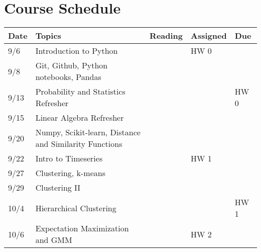 \documentclass[11pt]{article}
\begin{document}
\newpage
\section*{Course Schedule}

\small
\begin{centering}
\begin{tabular}{||l|p{3in}|l|l|l||}
\hline\hline
Date & Topics  & Reading & Assigned & Due  \\
\hline\hline
9/6 & Introduction to Python &  &  HW 0 & \\
9/8 & Git, Github, Python notebooks, Pandas & & & \\

\hline
9/13 & Probability and Statistics Refresher & &  & HW 0 \\
9/15 & Linear Algebra Refresher & & & \\
\hline

 9/20 & Numpy, Scikit-learn, Distance and Similarity Functions & &  & \\
9/22 & Intro to Timeseries & & HW 1 & \\ 
\hline

9/27 & Clustering, k-means & & & \\
9/29 & Clustering II & & & \\ 
\hline

10/4 & Hierarchical Clustering & & & HW 1 \\  
10/6 & Expectation Maximization and GMM & & HW 2 & \\ 
\hline


\end{tabular}
\end{centering}
\end{document}
